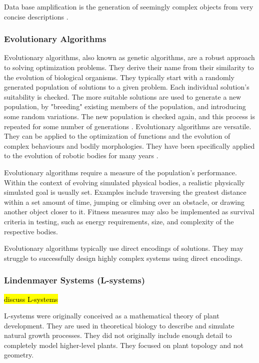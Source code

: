 Data base amplification is the generation of seemingly complex objects from very concise descriptions \cite{Prusinkiewicz2004}.

\subsubsection{Evolutionary Algorithms}

Evolutionary algorithms, also known as genetic algorithms, are a robust approach to solving optimization problems. They derive their name from their similarity to the evolution of biological organisms. They typically start with a randomly generated population of solutions to a given problem. Each individual solution's suitability is checked. The more suitable solutions are used to generate a new population, by "breeding" existing members of the population, and introducing some random variations. The new population is checked again, and this process is repeated for some number of generations \cite{Groenwold1999}. Evolutionary algorithms are versatile. They can be applied to the optimization of functions and the evolution of complex behaviours and bodily morphologies. They have been specifically applied to the evolution of robotic bodies for many years \cite{Sims1994a,Sims1994b}.

Evolutionary algorithms require a measure of the population's performance. Within the context of evolving simulated physical bodies, a realistic physically simulated goal is usually set. Examples include traversing the greatest distance within a set amount of time, jumping or climbing over an obstacle, or drawing another object closer to it. Fitness measures may also be implemented as survival criteria in testing, such as energy requirements, size, and complexity of the respective bodies. \cite{Sims1994a, Sims1994b}

Evolutionary algorithms typically use direct encodings of solutions. They may struggle to successfully design highly complex systems using direct encodings. \cite{Hornby2001b}

\subsubsection{Lindenmayer Systems (L-systems)}

\hl{discuss L-systems}

L-systems were originally conceived as a mathematical theory of plant development. They are used in theoretical biology to describe and simulate natural growth processes. They did not originally include enough detail to completely model higher-level plants. They focused on plant topology and not geometry. \cite{Kolodziej2002,Prusinkiewicz2004}

